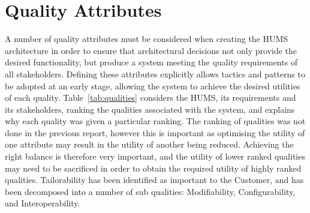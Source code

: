 \documentclass[10pt,a4paper]{article}
\begin{document}
\section{Quality Attributes}
\label{sec:qualities}
A number of quality attributes must be considered when creating the HUMS architecture in order to ensure that architectural decisions not only provide the desired functionality, but produce a system meeting the quality requirements of all stakeholders.
Defining these attributes explicitly allows tactics and patterns to be adopted at an early stage, allowing the system to achieve the desired utilities of each quality. 
Table~\ref{tab:qualities} considers the HUMS, its requirements and its stakeholders, ranking the qualities associated with the system, and explains why each quality was given a particular ranking. The ranking of qualities was not done in the previous report, however this is important as optimising the utility of one attribute may result in the utility of another being reduced. Achieving the right balance is therefore very important, and the utility of lower ranked qualities may need to be sacrificed in order to obtain the required utility of highly ranked qualities. Tailorability has been identified as important to the Customer, and has been decomposed into a number of sub qualities: Modifiability, Configurability, and Interoperability.
\end{document}
